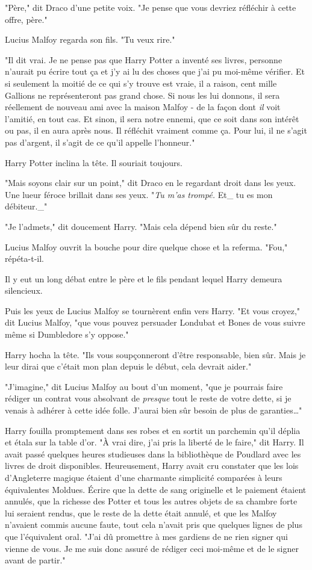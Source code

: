 "Père," dit Draco d'une petite voix. "Je pense que vous devriez réfléchir à cette offre, père."

Lucius Malfoy regarda son fils. "Tu veux rire."

"Il dit vrai. Je ne pense pas que Harry Potter a inventé ses livres, personne n'aurait pu écrire tout ça et j'y ai lu des choses que j'ai pu moi-même vérifier. Et si seulement la moitié de ce qui s'y trouve est vraie, il a raison, cent mille Gallions ne représenteront pas grand chose. Si nous les lui donnons, il sera réellement de nouveau ami avec la maison Malfoy - de la façon dont \emph{il}  voit l'amitié, en tout cas. Et sinon, il sera notre ennemi, que ce soit dans son intérêt ou pas, il en aura après nous. Il réfléchit vraiment comme ça. Pour lui, il ne s'agit pas d'argent, il s'agit de ce qu'il appelle l'honneur."

Harry Potter inclina la tête. Il souriait toujours.

"Mais soyons clair sur un point," dit Draco en le regardant droit dans les yeux. Une lueur féroce brillait dans ses yeux. "\emph{Tu m'as trompé. } Et\_ tu es mon débiteur.\_"

"Je l'admets," dit doucement Harry. "Mais cela dépend bien sûr du reste."

Lucius Malfoy ouvrit la bouche pour dire quelque chose et la referma. "Fou," répéta-t-il.

Il y eut un long débat entre le père et le fils pendant lequel Harry demeura silencieux.

Puis les yeux de Lucius Malfoy se tournèrent enfin vers Harry. "Et vous croyez," dit Lucius Malfoy, "que vous pouvez persuader Londubat et Bones de vous suivre même si Dumbledore s'y oppose."

Harry hocha la tête. "Ils vous soupçonneront d'être responsable, bien sûr. Mais je leur dirai que c'était mon plan depuis le début, cela devrait aider."

"J'imagine," dit Lucius Malfoy au bout d'un moment, "que je pourrais faire rédiger un contrat vous absolvant de \emph{presque}  tout le reste de votre dette, si je venais à adhérer à cette idée folle. J'aurai bien sûr besoin de plus de garanties…"

Harry fouilla promptement dans ses robes et en sortit un parchemin qu'il déplia et étala sur la table d'or. "À vrai dire, j'ai pris la liberté de le faire," dit Harry. Il avait passé quelques heures studieuses dans la bibliothèque de Poudlard avec les livres de droit disponibles. Heureusement, Harry avait cru constater que les lois d'Angleterre magique étaient d'une charmante simplicité comparées à leurs équivalentes Moldues. Écrire que la dette de sang originelle et le paiement étaient annulés, que la richesse des Potter et tous les autres objets de sa chambre forte lui seraient rendus, que le reste de la dette était annulé, et que les Malfoy n'avaient commis aucune faute, tout cela n'avait pris que quelques lignes de plus que l'équivalent oral. "J'ai dû promettre à mes gardiens de ne rien signer qui vienne de vous. Je me suis donc assuré de rédiger ceci moi-même et de le signer avant de partir."

